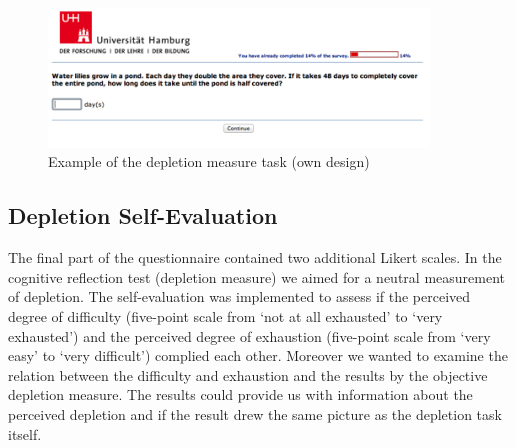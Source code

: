 \begin{figure}[h!]
\center
	\includegraphics[width=0.9\textwidth]{images/os_depletion_measure.png}
  \caption{Example of the depletion measure task (own design)}\label{fig:os_depletion_measure}
\end{figure}

\subsection{Depletion Self-Evaluation}\label{sec:depletionself-evaluation}
The final part of the questionnaire contained two additional Likert scales. In the cognitive reflection test (depletion measure) we aimed for a neutral measurement of depletion. The self-evaluation was implemented to assess if the perceived degree of difficulty (five-point scale from ‘not at all exhausted’ to ‘very exhausted’) and the perceived degree of exhaustion (five-point scale from ‘very easy’ to ‘very difficult’) complied each other. Moreover we wanted to examine the relation between the difficulty and exhaustion and the results by the objective depletion measure. The results could provide us with information about the perceived depletion and if the result drew the same picture as the depletion task itself. 

